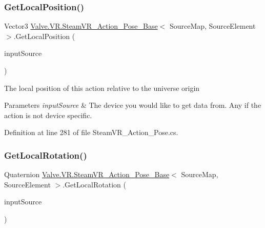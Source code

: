 \subsubsection{\texorpdfstring{GetLocalPosition()}{GetLocalPosition()}}
{\footnotesize\ttfamily Vector3 \mbox{\hyperlink{class_valve_1_1_v_r_1_1_steam_v_r___action___pose___base}{Valve.\+V\+R.\+Steam\+V\+R\+\_\+\+Action\+\_\+\+Pose\+\_\+\+Base}}$<$ Source\+Map, Source\+Element $>$.Get\+Local\+Position (\begin{DoxyParamCaption}\item[{\mbox{\hyperlink{namespace_valve_1_1_v_r_a82e5bf501cc3aa155444ee3f0662853f}{Steam\+V\+R\+\_\+\+Input\+\_\+\+Sources}}}]{input\+Source }\end{DoxyParamCaption})}



The local position of this action relative to the universe origin 


\begin{DoxyParams}{Parameters}
{\em input\+Source} & The device you would like to get data from. Any if the action is not device specific.\\
\hline
\end{DoxyParams}


Definition at line 281 of file Steam\+V\+R\+\_\+\+Action\+\_\+\+Pose.\+cs.

\mbox{\label{class_valve_1_1_v_r_1_1_steam_v_r___action___pose___base_a4cd01c8865799b4abdb3aa05c9bce7a1}} 
\subsubsection{\texorpdfstring{GetLocalRotation()}{GetLocalRotation()}}
{\footnotesize\ttfamily Quaternion \mbox{\hyperlink{class_valve_1_1_v_r_1_1_steam_v_r___action___pose___base}{Valve.\+V\+R.\+Steam\+V\+R\+\_\+\+Action\+\_\+\+Pose\+\_\+\+Base}}$<$ Source\+Map, Source\+Element $>$.Get\+Local\+Rotation (\begin{DoxyParamCaption}\item[{\mbox{\hyperlink{namespace_valve_1_1_v_r_a82e5bf501cc3aa155444ee3f0662853f}{Steam\+V\+R\+\_\+\+Input\+\_\+\+Sources}}}]{input\+Source }\end{DoxyParamCaption})}



